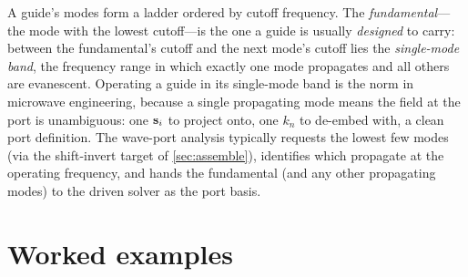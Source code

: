 A guide's modes form a ladder ordered by cutoff frequency. The
\emph{fundamental}---the mode with the lowest cutoff---is the one a guide is
usually \emph{designed} to carry: between the fundamental's cutoff and the next
mode's cutoff lies the \emph{single-mode band}, the frequency range in which
exactly one mode propagates and all others are evanescent. Operating a guide in its
single-mode band is the norm in microwave engineering, because a single propagating
mode means the field at the port is unambiguous: one $\mathbf{s}_i$ to project onto, one
$k_n$ to de-embed with, a clean port definition. The wave-port analysis typically
requests the lowest few modes (via the shift-invert target of \cref{sec:assemble}),
identifies which propagate at the operating frequency, and hands the fundamental
(and any other propagating modes) to the driven solver as the port basis.

\section{Worked examples}

